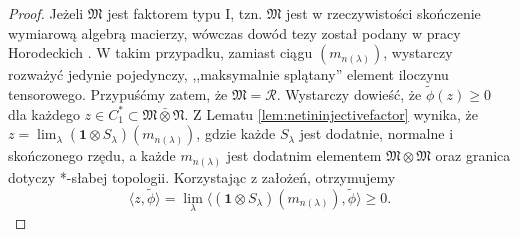 \begin{proof}
Jeżeli $\mathfrak{M}$ jest faktorem typu I, tzn. $\mathfrak{M}$ jest
w rzeczywistości skończenie wymiarową algebrą macierzy,
wówczas dowód tezy został podany w pracy Horodeckich
\cite{horodecki1996separability}.
W takim przypadku, zamiast ciągu $(m_{n(\lambda)})$,
wystarczy rozważyć jedynie pojedynczy,
,,maksymalnie splątany'' element iloczynu tensorowego.
Przypuśćmy zatem, że $\mathfrak{M} = \mathcal{R}$.
Wystarczy dowieść, że
$\tilde{\phi}(z) \geq 0$ dla każdego
$z \in C_{1}^{*} \subset \mathfrak{M} \bar{\otimes} \mathfrak{N}$.
Z Lematu \ref{lem:netininjectivefactor} wynika, że
$z = \lim_{\lambda} (\mathbf{1} \otimes S_{\lambda})(m_{n(\lambda)})$,
gdzie każde $S_{\lambda}$
jest dodatnie, normalne i skończonego rzędu,
a każde $m_{n(\lambda)}$ jest dodatnim elementem $\mathfrak{M} \otimes \mathfrak{M}$
oraz granica dotyczy *-słabej topologii.
Korzystając z założeń, otrzymujemy
\begin{equation}
\langle z , \tilde{\phi} \rangle =\lim \limits_{\lambda}
\langle ( \mathbf{1} \otimes S_{\lambda}) (m_{n(\lambda)}), \tilde{\phi}
\rangle \geq 0.
\end{equation}
\end{proof}

